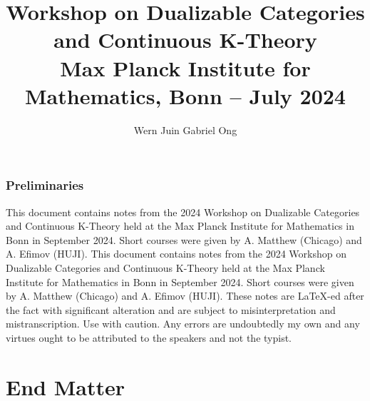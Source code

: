 \documentclass{amsart}
\theoremstyle{definition}
\numberwithin{equation}{section}
\begin{document}
\large
\title[Dualizable Categories and Continuous K-Theory -- MPIM 2024]{Workshop on Dualizable Categories and Continuous K-Theory \\ Max Planck Institute for Mathematics, Bonn -- July 2024}
\author{Wern Juin Gabriel Ong}
\address{Universit\"{a}t Bonn, Bonn, D-53111}
\maketitle
\section*{Preliminaries}
This document contains notes from the 2024 Workshop on Dualizable Categories and Continuous K-Theory held at the Max Planck Institute for Mathematics in Bonn in September 2024. Short courses were given by A. Matthew (Chicago) and A. Efimov (HUJI). 
This document contains notes from the 2024 Workshop on Dualizable Categories and Continuous K-Theory held at the Max Planck Institute for Mathematics in Bonn in September 2024. Short courses were given by A. Matthew (Chicago) and A. Efimov (HUJI). These notes are \LaTeX-ed after the fact with significant alteration and are subject to misinterpretation and mistranscription. Use with caution. Any errors are undoubtedly my own and any virtues ought to be attributed to the speakers and not the typist. 
\tableofcontents
\newpage
\part*{End Matter}
\printbibliography
\end{document}
